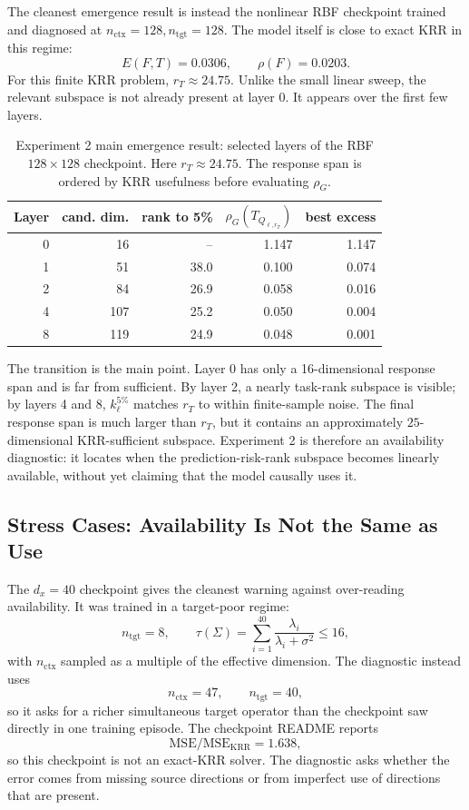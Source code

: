 \documentclass[11pt]{article}
\begin{document}
The cleanest emergence result is instead the nonlinear RBF checkpoint trained and diagnosed at
\(n_{\mathrm{ctx}}=128,n_{\mathrm{tgt}}=128\). The model itself is close to exact KRR in this regime:
\[
E(F,T)=0.0306,
\qquad
\rho(F)=0.0203.
\]
For this finite KRR problem, \(r_T\approx24.75\). Unlike the small linear sweep, the relevant
subspace is not already present at layer 0. It appears over the first few layers.

\begin{table}[htbp]
\centering
\caption{Experiment 2 main emergence result: selected layers of the RBF \(128\times128\) checkpoint.
Here \(r_T\approx24.75\). The response span is ordered by KRR usefulness before evaluating
\(\rho_G\).}
\scriptsize
\setlength{\tabcolsep}{4pt}
\renewcommand{\arraystretch}{0.9}
\begin{tabular}{rrrrr}
\toprule
Layer & cand. dim. & rank to 5\% & \(\rho_G(T_{Q_{\ell,r_T}})\) & best excess\\
\midrule
0 & 16  & --   & 1.147 & 1.147\\
1 & 51  & 38.0 & 0.100 & 0.074\\
2 & 84  & 26.9 & 0.058 & 0.016\\
4 & 107 & 25.2 & 0.050 & 0.004\\
8 & 119 & 24.9 & 0.048 & 0.001\\
\bottomrule
\end{tabular}
\renewcommand{\arraystretch}{1}
\end{table}

The transition is the main point. Layer 0 has only a 16-dimensional response span and is far from
sufficient. By layer 2, a nearly task-rank subspace is visible; by layers 4 and 8,
\(k_\ell^{5\%}\) matches \(r_T\) to within finite-sample noise. The final response span is much
larger than \(r_T\), but it contains an approximately \(25\)-dimensional KRR-sufficient subspace.
Experiment 2 is therefore an availability diagnostic: it locates when the prediction-risk-rank
subspace becomes linearly available, without yet claiming that the model causally uses it.

\subsection{Stress Cases: Availability Is Not the Same as Use}

The \(d_x=40\) checkpoint gives the cleanest warning against over-reading availability. It was
trained in a target-poor regime:
\[
n_{\mathrm{tgt}}=8,
\qquad
\tau(\Sigma)=\sum_{i=1}^{40}\frac{\lambda_i}{\lambda_i+\sigma^2}\le16,
\]
with \(n_{\mathrm{ctx}}\) sampled as a multiple of the effective dimension. The diagnostic instead
uses
\[
n_{\mathrm{ctx}}=47,\qquad n_{\mathrm{tgt}}=40,
\]
so it asks for a richer simultaneous target operator than the checkpoint saw directly in one
training episode. The checkpoint README reports
\[
\mathrm{MSE}/\mathrm{MSE}_{\mathrm{KRR}}=1.638,
\]
so this checkpoint is not an exact-KRR solver. The diagnostic asks whether the error comes from
missing source directions or from imperfect use of directions that are present.
\end{document}
